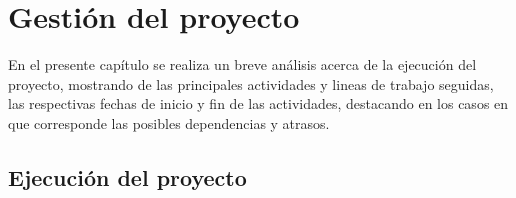 \chapter{Gestión del proyecto}

\ifpdf
    \graphicspath{{Chapter7/Figs/Raster/}{Chapter7/Figs/PDF/}{Chapter7/Figs/}}
\else
    \graphicspath{{Chapter7/Figs/Vector/}{Chapter7/Figs/}}
\fi

En el presente cap\'itulo se realiza un breve análisis acerca de la ejecuci\'on del proyecto, mostrando de las principales actividades y lineas de trabajo seguidas, las respectivas fechas de inicio y fin de las actividades, destacando en los casos en que corresponde las posibles dependencias y atrasos.

\section{Ejecuci\'on del proyecto}

